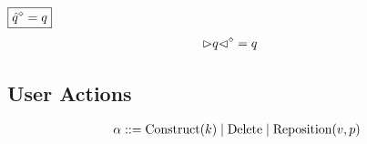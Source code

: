 \noindent $\boxed{\hat{q}\mathclose{}^{\diamond} = q}$
%
\begin{align*}
  {\vartriangleright}q{\vartriangleleft}\mathclose{}^{\diamond} &= q
\end{align*}


\subsection{User Actions}

\[
  \arraycolsep=0pt
  \begin{array}{llll}
    \alpha & {}::={} &
      \Construct{k}
      \mid \Delete
      \mid \Reposition{v, p}
    \\
  \end{array}
\]


